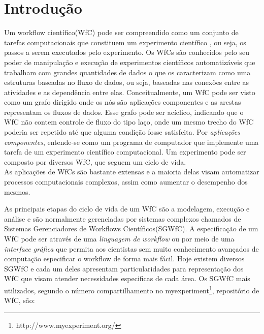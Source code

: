 \documentclass[a4paper,10pt]{article}
\begin{document}
\section*{Introdução}
	Um workflow científico(WfC) pode ser compreendido como um conjunto de tarefas computacionais que constituem um experimento científico \cite{Junior2012}, ou seja, os passos a serem executados pelo experimento. Os WfCs são conhecidos pelo seu poder de manipulação e execução de experimentos científicos automatizáveis que trabalham com grandes quantidades de dados o que os caracterizam como uma estruturas baseadas no fluxo de dados, ou seja, baseadas nas conexões entre as atividades e as dependência entre elas. Conceitualmente, um WfC pode ser visto como um grafo dirigido onde os nós são aplicações componentes e as arestas representam os fluxos de dados. Esse grafo pode ser acíclico, indicando que o WfC não contem controle de fluxo do tipo laço, onde um mesmo trecho do WfC poderia ser repetido até que alguma condição fosse satisfeita. Por \textit{aplicações componentes}, entende-se como um programa de computador que implemente uma tarefa de um experimento científico computacional\cite{Junior2012}. Um experimento pode ser composto por diversos WfC, que seguem um ciclo de vida.\\

	As aplicações de WfCs são bastante extensas e a maioria delas visam automatizar processos computacionais complexos, assim como aumentar o desempenho dos mesmos.
	
	As principais etapas do ciclo de vida de um WfC são a modelagem, execução e análise e são normalmente gerenciadas por sistemas complexos chamados de Sistemas Gerenciadores de Workflows Científicos(SGWfC). A especificação de um WfC pode ser através de uma \textit{linguagem de workflow} ou por meio de uma \textit{interface gráfica} que permita aos cientistas sem muito conhecimento avançados de computação especificar o workflow de forma mais fácil. Hoje existem diversos SGWfC e cada um deles apresentam particularidades para representação dos WfC que visam atender necessidades especificas de cada área. Os SGWfC mais utilizados, segundo o número compartilhamento no myexperiment\footnote{http://www.myexperiment.org/}, repositório de WfC, são:
	
\end{document}
